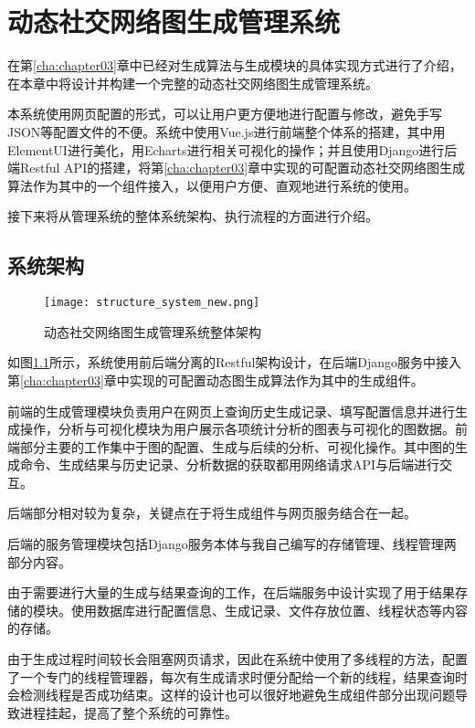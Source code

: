 
\chapter{动态社交网络图生成管理系统}
\label{cha:chapter04}

在第\ref{cha:chapter03}章中已经对生成算法与生成模块的具体实现方式进行了介绍，在本章中将设计并构建一个完整的动态社交网络图生成管理系统。

本系统使用网页配置的形式，可以让用户更方便地进行配置与修改，避免手写JSON等配置文件的不便。系统中使用Vue.js进行前端整个体系的搭建，其中用ElementUI进行美化，用Echarts进行相关可视化的操作；并且使用Django进行后端Restful API的搭建，将第\ref{cha:chapter03}章中实现的可配置动态社交网络图生成算法作为其中的一个组件接入，以便用户方便、直观地进行系统的使用。

接下来将从管理系统的整体系统架构、执行流程的方面进行介绍。

\section{系统架构}

\begin{figure}[H]
  \centering
  \texttt{[image: structure\_system\_new.png]}
  \caption{动态社交网络图生成管理系统整体架构}
  \label{fig:web_system}
\end{figure}

如图\ref{fig:web_system}所示，系统使用前后端分离的Restful架构设计，在后端Django服务中接入第\ref{cha:chapter03}章中实现的可配置动态图生成算法作为其中的生成组件。

前端的生成管理模块负责用户在网页上查询历史生成记录、填写配置信息并进行生成操作，分析与可视化模块为用户展示各项统计分析的图表与可视化的图数据。前端部分主要的工作集中于图的配置、生成与后续的分析、可视化操作。其中图的生成命令、生成结果与历史记录、分析数据的获取都用网络请求API与后端进行交互。

后端部分相对较为复杂，关键点在于将生成组件与网页服务结合在一起。

后端的服务管理模块包括Django服务本体与我自己编写的存储管理、线程管理两部分内容。

由于需要进行大量的生成与结果查询的工作，在后端服务中设计实现了用于结果存储的模块。使用数据库进行配置信息、生成记录、文件存放位置、线程状态等内容的存储。

由于生成过程时间较长会阻塞网页请求，因此在系统中使用了多线程的方法，配置了一个专门的线程管理器，每次有生成请求时便分配给一个新的线程，结果查询时会检测线程是否成功结束。这样的设计也可以很好地避免生成组件部分出现问题导致进程挂起，提高了整个系统的可靠性。

